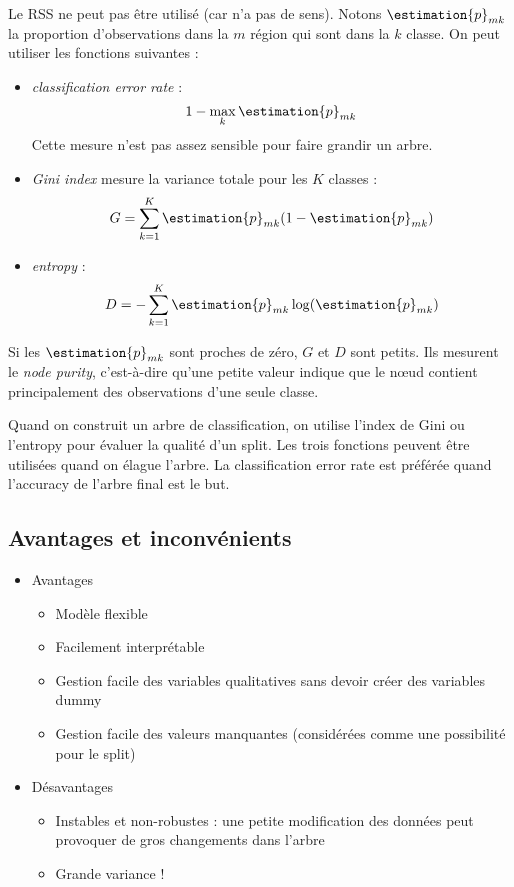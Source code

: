         Le RSS ne peut pas être utilisé (car n'a pas de sens). Notons \(\estimation{p}_{mk}\) la proportion d'observations dans la \(m\)\ieme{} région qui sont dans la \(k\)\ieme{} classe. On peut utiliser les fonctions suivantes :
        \begin{itemize}
            \item \textit{classification error rate} :
            \[
                1 - \max_k \estimation{p}_{mk}
            \]
            Cette mesure n'est pas assez sensible pour faire grandir un arbre.
            \item \textit{Gini index} mesure la variance totale pour les \(K\) classes :
            \[
                G = \sum_{k=1}^K \estimation{p}_{mk} (1 - \estimation{p}_{mk})
            \]
            \item \textit{entropy} :
            \[
                D = -\sum_{k=1}^K \estimation{p}_{mk} \log(\estimation{p}_{mk})
            \]
        \end{itemize}

        Si les \(\estimation{p}_{mk}\) sont proches de zéro, \(G\) et \(D\) sont petits. Ils mesurent le \textit{node purity}, c'est-à-dire qu'une petite valeur indique que le nœud contient principalement des observations d'une seule classe.

        Quand on construit un arbre de classification, on utilise l'index de Gini ou l'entropy pour évaluer la qualité d'un split. Les trois fonctions peuvent être utilisées quand on élague l'arbre. La classification error rate est préférée quand l'accuracy de l'arbre final est le but.

    \subsection{Avantages et inconvénients}
        \begin{itemize}
            \item Avantages
            \begin{itemize}
                \item Modèle flexible
                \item Facilement interprétable
                \item Gestion facile des variables qualitatives sans devoir créer des variables dummy
                \item Gestion facile des valeurs manquantes (considérées comme une possibilité pour le split)
            \end{itemize}
            \item Désavantages
            \begin{itemize}
                \item Instables et non-robustes : une petite modification des données peut provoquer de gros changements dans l'arbre
                \item Grande variance !
            \end{itemize}
        \end{itemize}

